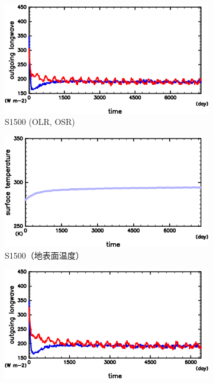 \documentclass[body]{subfiles}
\begin{document}
\begin{figure}[t]
\begin{subfigure}{.4\textwidth}
		\centering
		\includegraphics[width=\textwidth]{S1500/S1500_OLRA-OSRA_horimean_time0.0-7300.0-crop.png}
		\caption{S1500 (OLR, OSR)}\label{S1500_OLRA}
	\end{subfigure}
	\begin{subfigure}{.4\textwidth}
		\centering
		\includegraphics[width=\textwidth]{S1500/S1500_SurfTemp_horimean_time0.0-7300.0-crop.png}
		\caption{S1500（地表面温度）}\label{S1500_SurfTemp}
	\end{subfigure}
	\begin{subfigure}{.4\textwidth}
		\centering
		\includegraphics[width=\textwidth]{S1600/S1600_OLRA-OSRA_horimean_time0.0-7300.0-crop.png}

\end{subfigure}
\end{figure}
\end{document}
